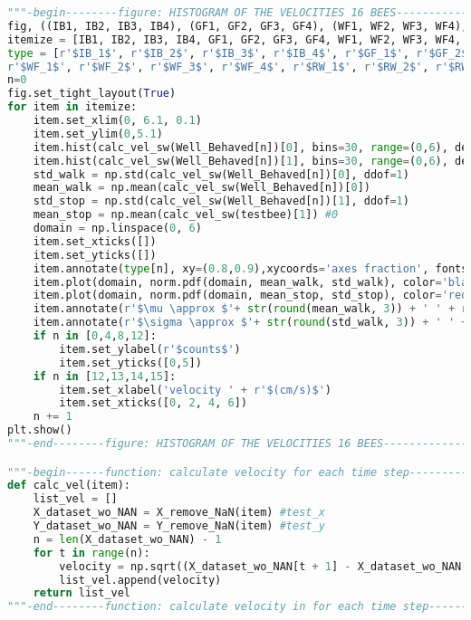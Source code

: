 \begin{lstlisting}[language=Python, basicstyle=\tiny, frame=single, keywordstyle=\color{teal}, commentstyle=\color{olive}, stringstyle=\color{red}]
"""-begin--------figure: HISTOGRAM OF THE VELOCITIES 16 BEES-----------------"""
fig, ((IB1, IB2, IB3, IB4), (GF1, GF2, GF3, GF4), (WF1, WF2, WF3, WF4), (RW1, RW2, RW3, RW4)) = plt.subplots(4, 4, figsize=(10,10))
itemize = [IB1, IB2, IB3, IB4, GF1, GF2, GF3, GF4, WF1, WF2, WF3, WF4, RW1, RW2, RW3, RW4]
type = [r'$IB_1$', r'$IB_2$', r'$IB_3$', r'$IB_4$', r'$GF_1$', r'$GF_2$', r'$GF_3$', r'$GF_4$', 
r'$WF_1$', r'$WF_2$', r'$WF_3$', r'$WF_4$', r'$RW_1$', r'$RW_2$', r'$RW_3$', r'$RW_4$']
n=0
fig.set_tight_layout(True)
for item in itemize:
    item.set_xlim(0, 6.1, 0.1)
    item.set_ylim(0,5.1)
    item.hist(calc_vel_sw(Well_Behaved[n])[0], bins=30, range=(0,6), density=True, alpha=0.50, color='blue', label='valid data')
    item.hist(calc_vel_sw(Well_Behaved[n])[1], bins=30, range=(0,6), density=True, alpha=0.50, color='red', label='removed data')
    std_walk = np.std(calc_vel_sw(Well_Behaved[n])[0], ddof=1)
    mean_walk = np.mean(calc_vel_sw(Well_Behaved[n])[0])
    std_stop = np.std(calc_vel_sw(Well_Behaved[n])[1], ddof=1)
    mean_stop = np.mean(calc_vel_sw(testbee)[1]) #0
    domain = np.linspace(0, 6)
    item.set_xticks([])
    item.set_yticks([])
    item.annotate(type[n], xy=(0.8,0.9),xycoords='axes fraction', fontsize=12)
    item.plot(domain, norm.pdf(domain, mean_walk, std_walk), color='black', linestyle='dashed')
    item.plot(domain, norm.pdf(domain, mean_stop, std_stop), color='red', linestyle='dashed')
    item.annotate(r'$\mu \approx $'+ str(round(mean_walk, 3)) + ' ' + r'$cm/s$', xy=(0.1,0.9), xycoords='axes fraction', fontsize=10)
    item.annotate(r'$\sigma \approx $'+ str(round(std_walk, 3)) + ' ' + r'$cm/s$', xy=(0.1,0.8), xycoords='axes fraction', fontsize=10)
    if n in [0,4,8,12]:
        item.set_ylabel(r'$counts$')
        item.set_yticks([0,5])
    if n in [12,13,14,15]:
        item.set_xlabel('velocity ' + r'$(cm/s)$')
        item.set_xticks([0, 2, 4, 6])
    n += 1
plt.show()
"""-end--------figure: HISTOGRAM OF THE VELOCITIES 16 BEES-----------------"""

"""-begin------function: calculate velocity for each time step---------------"""
def calc_vel(item):
    list_vel = []
    X_dataset_wo_NAN = X_remove_NaN(item) #test_x
    Y_dataset_wo_NAN = Y_remove_NaN(item) #test_y
    n = len(X_dataset_wo_NAN) - 1
    for t in range(n):
        velocity = np.sqrt((X_dataset_wo_NAN[t + 1] - X_dataset_wo_NAN[t]) ** 2 + (Y_dataset_wo_NAN[t + 1] - Y_dataset_wo_NAN[t]) ** 2)
        list_vel.append(velocity)
    return list_vel
"""-end--------function: calculate velocity in for each time step------------"""


\end{lstlisting}
